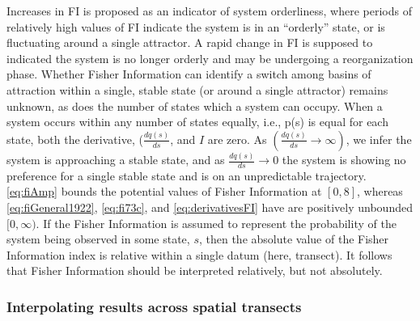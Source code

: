 \documentclass[12pt,twoside,openany]{reedthesis}
\begin{document}
Increases in FI is proposed as an indicator of system orderliness, where
periods of relatively high values of FI indicate the system is in an
``orderly'' state, or is fluctuating around a single attractor. A rapid
change in FI is supposed to indicated the system is no longer orderly
and may be undergoing a reorganization phase. Whether Fisher Information
can identify a switch among basins of attraction within a single, stable
state (or around a single attractor) remains unknown, as does the number
of states which a system can occupy. When a system occurs within any
number of states equally, i.e., p(s) is equal for each state, both the
derivative, (\(\frac{dq(s)}{ds}\), and \(I\) are zero. As
\((\frac{dq(s)}{ds} \rightarrow \infty)\), we infer the system is
approaching a stable state, and as \(\frac{dq(s)}{ds} \rightarrow 0\)
the system is showing no preference for a single stable state and is on
an unpredictable trajectory. \eqref{eq:fiAmp} bounds the potential values
of Fisher Information at \([0, 8]\), whereas \eqref{eq:fiGeneral1922},
\eqref{eq:fi73c}, and \eqref{eq:derivativesFI} have are positively unbounded
\([0, \infty)\). If the Fisher Information is assumed to represent the
probability of the system being observed in some state, \(s\), then the
absolute value of the Fisher Information index is relative within a
single datum (here, transect). It follows that Fisher Information should
be interpreted relatively, but not absolutely.

\subsubsection{Interpolating results across spatial
transects}\label{interpolating-results-across-spatial-transects}
\end{document}
